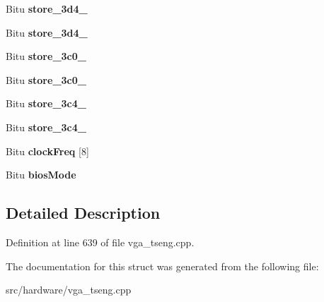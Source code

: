 \begin{DoxyCompactItemize}
\item 
\hypertarget{structSVGA__ET3K__DATA_a3d6626384c671feeede9375bb45ad6cf}{Bitu {\bfseries store\-\_\-3d4\-\_}}\label{structSVGA__ET3K__DATA_a3d6626384c671feeede9375bb45ad6cf}

\item 
\hypertarget{structSVGA__ET3K__DATA_ab1dd50235ef39aa09c4ded3eb832e5fa}{Bitu {\bfseries store\-\_\-3d4\-\_}}\label{structSVGA__ET3K__DATA_ab1dd50235ef39aa09c4ded3eb832e5fa}

\item 
\hypertarget{structSVGA__ET3K__DATA_a97cf442e5e9b0b90e03575d81a3aae79}{Bitu {\bfseries store\-\_\-3c0\-\_}}\label{structSVGA__ET3K__DATA_a97cf442e5e9b0b90e03575d81a3aae79}

\item 
\hypertarget{structSVGA__ET3K__DATA_a9fa835747953f5e4e902633b73bc3e85}{Bitu {\bfseries store\-\_\-3c0\-\_}}\label{structSVGA__ET3K__DATA_a9fa835747953f5e4e902633b73bc3e85}

\item 
\hypertarget{structSVGA__ET3K__DATA_aeaedb6e1c9092b279657d5f91fea47b1}{Bitu {\bfseries store\-\_\-3c4\-\_}}\label{structSVGA__ET3K__DATA_aeaedb6e1c9092b279657d5f91fea47b1}

\item 
\hypertarget{structSVGA__ET3K__DATA_ac500854ef142ca0216542d6d763f75b8}{Bitu {\bfseries store\-\_\-3c4\-\_}}\label{structSVGA__ET3K__DATA_ac500854ef142ca0216542d6d763f75b8}

\item 
\hypertarget{structSVGA__ET3K__DATA_a91bf3ec1d0b94b359a2465076a604bfc}{Bitu {\bfseries clock\-Freq} \mbox{[}8\mbox{]}}\label{structSVGA__ET3K__DATA_a91bf3ec1d0b94b359a2465076a604bfc}

\item 
\hypertarget{structSVGA__ET3K__DATA_ac51787ec5154f04d1d84e714f262d284}{Bitu {\bfseries bios\-Mode}}\label{structSVGA__ET3K__DATA_ac51787ec5154f04d1d84e714f262d284}

\end{DoxyCompactItemize}


\subsection{Detailed Description}


Definition at line 639 of file vga\-\_\-tseng.\-cpp.



The documentation for this struct was generated from the following file\-:\begin{DoxyCompactItemize}
\item 
src/hardware/vga\-\_\-tseng.\-cpp\end{DoxyCompactItemize}
